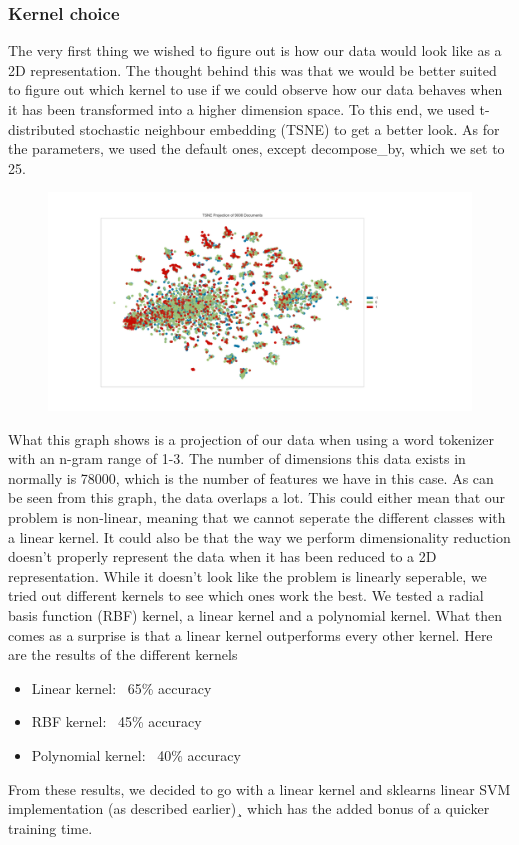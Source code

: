 \subsubsection{Kernel choice}
The very first thing we wished to figure out is how our data would look like as a 2D representation. The thought behind this was that we would be better suited to figure out which kernel to use if we could observe how our data behaves when it has been transformed into a higher dimension space. To this end, we used t-distributed stochastic neighbour embedding (TSNE\cite{tsne}) to get a better look. As for the parameters, we used the default ones, except decompose\_by, which we set to 25.
\begin{figure}[H]
    \includegraphics[width=14cm]{Images/TSNEProjectionWord}
    \centering
    \label{TSNEProjectionWord}
\end{figure}
What this graph shows is a projection of our data when using a word tokenizer with an n-gram range of 1-3. The number of dimensions this data exists in normally is 78000, which is the number of features we have in this case.
As can be seen from this graph, the data overlaps a lot. This could either mean that our problem is non-linear, meaning that we cannot seperate the different classes with a linear kernel. It could also be that the way we perform dimensionality reduction doesn't properly represent the data when it has been reduced to a 2D representation.
While it doesn't look like the problem is linearly seperable, we tried out different kernels to see which ones work the best. We tested a radial basis function (RBF) kernel, a linear kernel and a polynomial kernel. What then comes as a surprise is that a linear kernel outperforms every other kernel.
Here are the results of the different kernels
\begin{itemize}
    \item Linear kernel: ~65\% accuracy
    \item RBF kernel: ~45\% accuracy
    \item Polynomial kernel: ~40\% accuracy
\end{itemize}
From these results, we decided to go with a linear kernel and sklearns linear SVM implementation (as described earlier)¸ which has the added bonus of a quicker training time.

